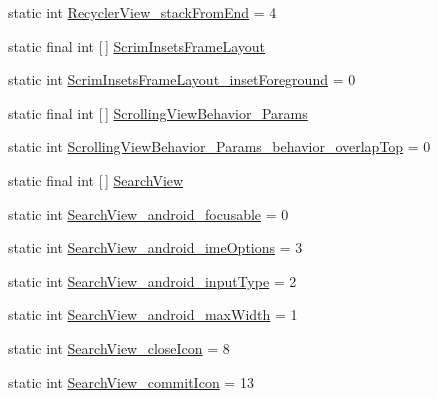 \begin{DoxyCompactItemize}
\item 
static int \hyperlink{classandroid_1_1support_1_1v7_1_1appcompat_1_1R_1_1styleable_af2042a32a5c4358617f057338c016568}{Recycler\+View\+\_\+stack\+From\+End} = 4
\item 
static final int \mbox{[}$\,$\mbox{]} \hyperlink{classandroid_1_1support_1_1v7_1_1appcompat_1_1R_1_1styleable_af376156dde80b171fe1fca622ce00921}{Scrim\+Insets\+Frame\+Layout}
\item 
static int \hyperlink{classandroid_1_1support_1_1v7_1_1appcompat_1_1R_1_1styleable_a313bb6eaa7f60f9308d2d585cff17d58}{Scrim\+Insets\+Frame\+Layout\+\_\+inset\+Foreground} = 0
\item 
static final int \mbox{[}$\,$\mbox{]} \hyperlink{classandroid_1_1support_1_1v7_1_1appcompat_1_1R_1_1styleable_a0f3b26fd53511c29976d0f2c70a6b4f4}{Scrolling\+View\+Behavior\+\_\+\+Params}
\item 
static int \hyperlink{classandroid_1_1support_1_1v7_1_1appcompat_1_1R_1_1styleable_abf0bf54a4df691d236a3aa5891732c78}{Scrolling\+View\+Behavior\+\_\+\+Params\+\_\+behavior\+\_\+overlap\+Top} = 0
\item 
static final int \mbox{[}$\,$\mbox{]} \hyperlink{classandroid_1_1support_1_1v7_1_1appcompat_1_1R_1_1styleable_a01af09df9e38f1e4f57165c3d3cee9fe}{Search\+View}
\item 
static int \hyperlink{classandroid_1_1support_1_1v7_1_1appcompat_1_1R_1_1styleable_aafdb0651b761f7d79703c2cbdb007eec}{Search\+View\+\_\+android\+\_\+focusable} = 0
\item 
static int \hyperlink{classandroid_1_1support_1_1v7_1_1appcompat_1_1R_1_1styleable_a532203151aa88d8386a459a3c5a7a355}{Search\+View\+\_\+android\+\_\+ime\+Options} = 3
\item 
static int \hyperlink{classandroid_1_1support_1_1v7_1_1appcompat_1_1R_1_1styleable_a961ee19122e31cefa5edcf20e27837e0}{Search\+View\+\_\+android\+\_\+input\+Type} = 2
\item 
static int \hyperlink{classandroid_1_1support_1_1v7_1_1appcompat_1_1R_1_1styleable_a734d834efc9a3afe64b8db664732ff12}{Search\+View\+\_\+android\+\_\+max\+Width} = 1
\item 
static int \hyperlink{classandroid_1_1support_1_1v7_1_1appcompat_1_1R_1_1styleable_a7325792da95c39bc84bbe457b170676d}{Search\+View\+\_\+close\+Icon} = 8
\item 
static int \hyperlink{classandroid_1_1support_1_1v7_1_1appcompat_1_1R_1_1styleable_afb59632753076895715c52a281d2ee4e}{Search\+View\+\_\+commit\+Icon} = 13
\item 

\end{DoxyCompactItemize}
